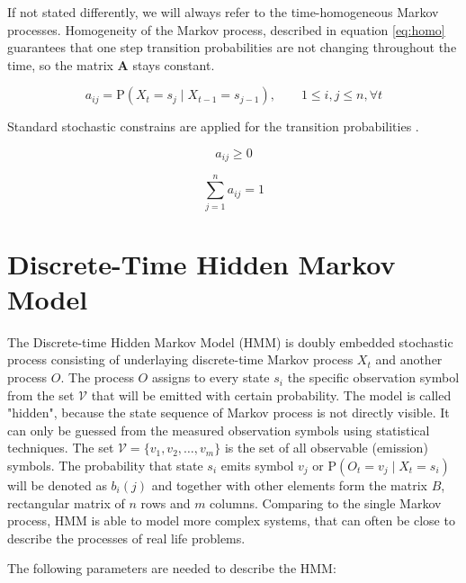 \documentclass[thesis=M,english]{FITthesis}[2012/10/20]
\newcommand{\matr}[1]{\mathbf{#1}}
\begin{document}
If not stated differently, we will always refer to the time-homogeneous Markov processes. Homogeneity of the Markov process, described in equation \eqref{eq:homo} guarantees that one step transition probabilities are not changing throughout the time, so the matrix $\matr{A}$ stays constant. 

\begin{equation}\label{eq:homo}
   a_{ij} = \mathrm{P}(X_t = s_j \mid X_{t-1} = s_{j-1} ),\qquad 1 \leq i,j \leq n, \forall t
\end{equation}

 Standard stochastic constrains are applied for the transition probabilities \cite{Ra89}.

\begin{equation}
   a_{ij} \geq 0
\end{equation}

\begin{equation}
   \sum_{j=1}^n a_{ij} = 1
\end{equation}

\section{Discrete-Time Hidden Markov Model}\label{sec:dthmm}

The Discrete-time Hidden Markov Model (HMM) is doubly embedded stochastic process consisting of underlaying discrete-time Markov process $X_t$ and another process $O$. The process $O$ assigns to every state $s_i$ the specific observation symbol from the set $\mathcal{V}$ that will be emitted with certain probability. The model is called "hidden", because the state sequence of Markov process is not directly visible. It can only be guessed from the measured observation symbols using statistical techniques. The set $\mathcal{V}=\{  v_1,v_2,\dots,v_m\}$ is the set of all observable (emission) symbols. The probability that state $s_i$ emits symbol $v_j$ or $\mathrm{P}( O_t = v_j  \mid X_t = s_i)$ will be denoted as $b_i(j)$ and together with other elements form the matrix $B$, rectangular matrix of $n$ rows and $m$ columns. Comparing to the single Markov process, HMM is able to model more complex systems, that can often be close to describe the processes of real life problems.  
  
The following parameters are needed to describe the HMM:
\end{document}
